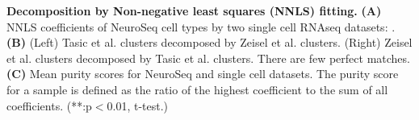 \textbf{Decomposition by Non-negative least squares (NNLS) fitting.}
\textbf{(A)} NNLS coefficients of NeuroSeq cell types by two single cell RNAseq datasets: \citep{Zeisel_2015,Tasic_2016}.
\textbf{(B)} (Left) Tasic et al. clusters decomposed by Zeisel et al. clusters. (Right) Zeisel et al. clusters decomposed by Tasic et al. clusters. There are few perfect matches.
\textbf{(C)} Mean purity scores for NeuroSeq and single cell datasets. The purity score for a sample is defined as the ratio of the highest coefficient to the sum of all coefficients. (**:p$<$0.01, t-test.)



